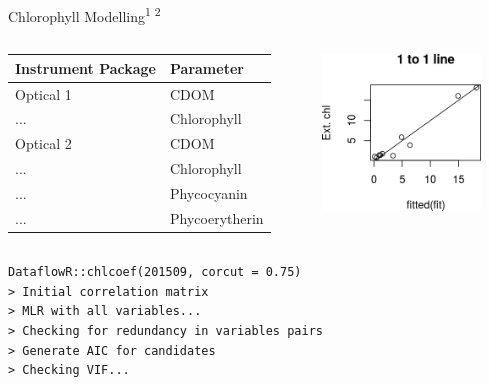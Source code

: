 \documentclass[compress,noflama,nosectionpages]{beamer}
\begin{document}
\begin{frame}{Chlorophyll Modelling\textsuperscript{1 2}}
\vspace{2pt}
	\begin{columns}
		\begin{column}{5cm}
			{\footnotesize
			\begin{tabular}{| l | l |}
				\hline
				Instrument Package & Parameter \\ \hline
				Optical 1 & CDOM \\
				... & Chlorophyll \\ \hline
				Optical 2 & CDOM \\ 
				... & Chlorophyll \\
				... & Phycocyanin \\
				... & Phycoerytherin \\ \hline
			\end{tabular}
			}
			\end{column}
			\begin{column}{4.5cm}
				\includegraphics[width=4.2cm,keepaspectratio=true]{figures/chl_onetoone.png}
			\end{column}
	\end{columns}
	\small
	\texttt{DataflowR::chlcoef(201509, corcut = 0.75)}\\
	\texttt{> Initial correlation matrix}\\
	\texttt{> MLR with all variables...}\\
	\texttt{> Checking for redundancy in variables pairs}\\
	\texttt{> Generate AIC for candidates}\\
	\texttt{> Checking VIF...} 
	
\tiny{}
\end{frame}
\end{document}
